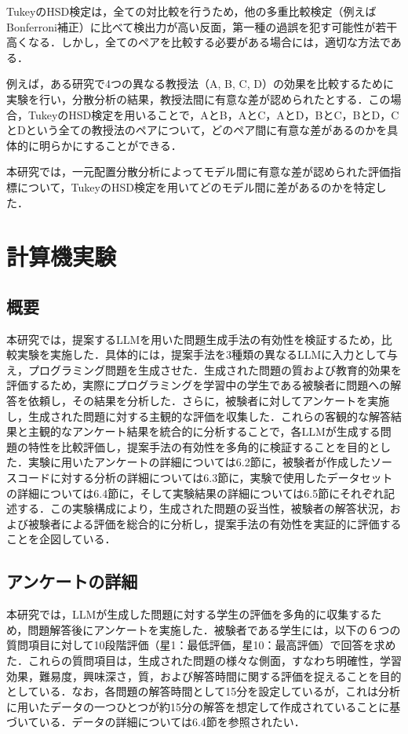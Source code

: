 \documentclass[11pt]{jreport}
\begin{document}
TukeyのHSD検定は，全ての対比較を行うため，他の多重比較検定（例えばBonferroni補正）に比べて検出力が高い反面，第一種の過誤を犯す可能性が若干高くなる．しかし，全てのペアを比較する必要がある場合には，適切な方法である．

例えば，ある研究で4つの異なる教授法（A, B, C, D）の効果を比較するために実験を行い，分散分析の結果，教授法間に有意な差が認められたとする．この場合，TukeyのHSD検定を用いることで，AとB，AとC，AとD，BとC，BとD，CとDという全ての教授法のペアについて，どのペア間に有意な差があるのかを具体的に明らかにすることができる．

本研究では，一元配置分散分析によってモデル間に有意な差が認められた評価指標について，TukeyのHSD検定を用いてどのモデル間に差があるのかを特定した．


\chapter{計算機実験}
\section{概要}
本研究では，提案するLLMを用いた問題生成手法の有効性を検証するため，比較実験を実施した．具体的には，提案手法を3種類の異なるLLMに入力として与え，プログラミング問題を生成させた．生成された問題の質および教育的効果を評価するため，実際にプログラミングを学習中の学生である被験者に問題への解答を依頼し，その結果を分析した．さらに，被験者に対してアンケートを実施し，生成された問題に対する主観的な評価を収集した．これらの客観的な解答結果と主観的なアンケート結果を統合的に分析することで，各LLMが生成する問題の特性を比較評価し，提案手法の有効性を多角的に検証することを目的とした．実験に用いたアンケートの詳細については6.2節に，被験者が作成したソースコードに対する分析の詳細については6.3節に，実験で使用したデータセットの詳細については6.4節に，そして実験結果の詳細については6.5節にそれぞれ記述する．この実験構成により，生成された問題の妥当性，被験者の解答状況，および被験者による評価を総合的に分析し，提案手法の有効性を実証的に評価することを企図している．
\section{アンケートの詳細}
本研究では，LLMが生成した問題に対する学生の評価を多角的に収集するため，問題解答後にアンケートを実施した．被験者である学生には，以下の６つの質問項目に対して10段階評価（星1：最低評価，星10：最高評価）で回答を求めた．これらの質問項目は，生成された問題の様々な側面，すなわち明確性，学習効果，難易度，興味深さ，質，および解答時間に関する評価を捉えることを目的としている．なお，各問題の解答時間として15分を設定しているが，これは分析に用いたデータの一つひとつが約15分の解答を想定して作成されていることに基づいている．データの詳細については6.4節を参照されたい．
\end{document}
